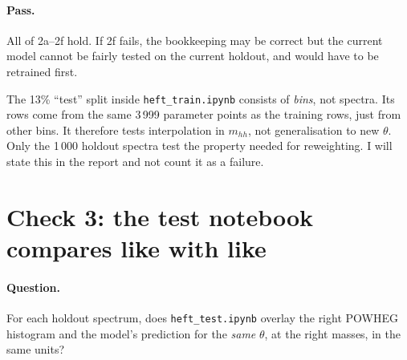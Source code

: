 \documentclass[11pt]{article}
\newcommand{\code}[1]{\texttt{#1}}
\newcommand{\mhh}{m_{hh}}
\begin{document}
\paragraph{Pass.} All of 2a--2f hold. If 2f fails, the bookkeeping may be correct
but the current model cannot be fairly tested on the current holdout, and would
have to be retrained first.

\begin{aside}
The 13\% ``test'' split inside \code{heft\_train.ipynb} consists of \emph{bins},
not spectra. Its rows come from the same 3\,999 parameter points as the training
rows, just from other bins. It therefore tests interpolation in $\mhh$, not
generalisation to new $\theta$. Only the 1\,000 holdout spectra test the
property needed for reweighting. I will state this in the report and not count it
as a failure.
\end{aside}

\section{Check 3: the test notebook compares like with like}

\paragraph{Question.} For each holdout spectrum, does \code{heft\_test.ipynb}
overlay the right POWHEG histogram and the model's prediction for the \emph{same}
$\theta$, at the right masses, in the same units?
\end{document}
